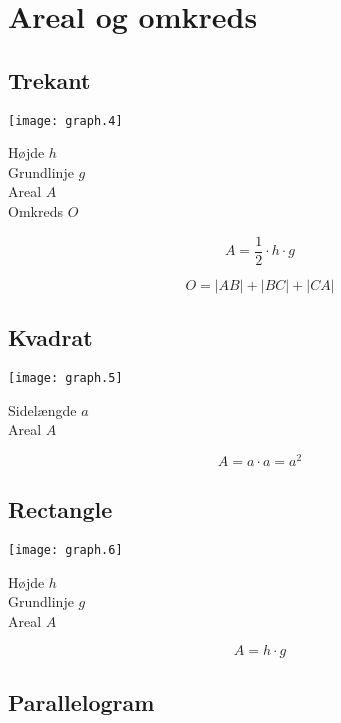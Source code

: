 \documentclass[11pt,a4paper,landscape,twocolumn,fleqn,leqno]{article}
\begin{document}
\section{Areal og omkreds}

\subsection{Trekant}

\texttt{[image: graph.4]}

Højde $h$ \\
Grundlinje $g$ \\
Areal $A$ \\
Omkreds $O$

\begin{equation}
A = \frac{1}{2} \cdot h \cdot g
\end{equation}

\begin{equation}
O = |AB| + |BC| + |CA|
\end{equation}

\vfill

\subsection{Kvadrat}

\texttt{[image: graph.5]}

Sidelængde $a$ \\
Areal $A$

\begin{equation}
A = a \cdot a = a^2
\end{equation}

\vfill

\subsection{Rectangle}

\texttt{[image: graph.6]}

Højde $h$ \\
Grundlinje $g$ \\
Areal $A$

\begin{equation}
A = h \cdot g
\end{equation}

\vfill

\subsection{Parallelogram}
\end{document}
